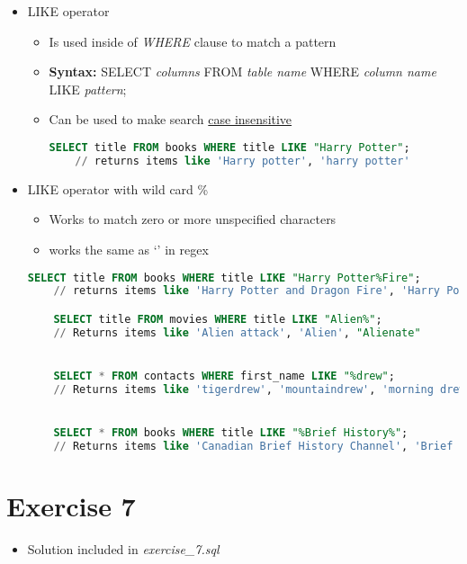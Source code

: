 \documentclass[12pt]{article}
\begin{document}
\begin{itemize}
    \item LIKE operator
    \begin{itemize}
        \item Is used inside of \textit{WHERE} clause to match a pattern
        \item \textbf{Syntax:} SELECT \textit{columns} FROM \textit{table name} WHERE \textit{column name} LIKE \textit{pattern};
        \item Can be used to make search \underline{case insensitive}

    \begin{lstlisting}[language=SQL]
    SELECT title FROM books WHERE title LIKE "Harry Potter";
    // returns items like 'Harry potter', 'harry potter'

    \end{lstlisting}
    \end{itemize}
    \item LIKE operator with wild card \%
    \begin{itemize}
        \item Works to match zero or more unspecified characters
        \item works the same as `\*' in regex
    \end{itemize}


    \begin{lstlisting}[language=SQL]
    SELECT title FROM books WHERE title LIKE "Harry Potter%Fire";
    // returns items like 'Harry Potter and Dragon Fire', 'Harry Potter and Fire', 'Harry Potter Rising Fire'

    SELECT title FROM movies WHERE title LIKE "Alien%";
    // Returns items like 'Alien attack', 'Alien', "Alienate"


    SELECT * FROM contacts WHERE first_name LIKE "%drew";
    // Returns items like 'tigerdrew', 'mountaindrew', 'morning drew', 'andrew'


    SELECT * FROM books WHERE title LIKE "%Brief History%";
    // Returns items like 'Canadian Brief History Channel', 'Brief History'
    \end{lstlisting}
\end{itemize}

\bigskip

\section{Exercise 7}

\bigskip

\begin{itemize}
    \item Solution included in \textit{exercise\_7.sql}
\end{itemize}

\bigskip
\end{document}
